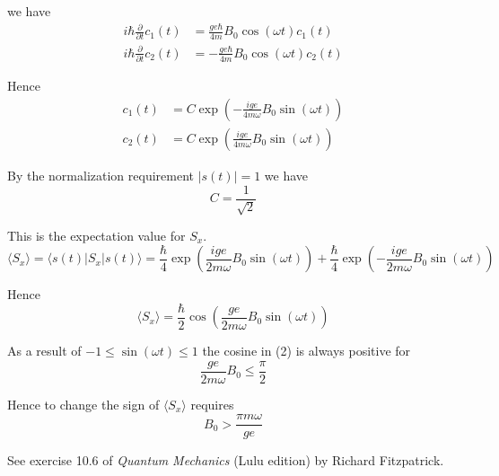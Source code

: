 we have
\begin{align*}
i\hbar\frac{\partial}{\partial t}c_1(t)&=\frac{ge\hbar}{4m}B_0\cos(\omega t)c_1(t)
\\
i\hbar\frac{\partial}{\partial t}c_2(t)&=-\frac{ge\hbar}{4m}B_0\cos(\omega t)c_2(t)
\end{align*}

Hence
\begin{equation*}
\begin{aligned}
c_1(t)&=C\exp\left(-\frac{ige}{4m\omega}B_0\sin(\omega t)\right)
\\
c_2(t)&=C\exp\left(\frac{ige}{4m\omega}B_0\sin(\omega t)\right)
\end{aligned}
\tag{1}
\end{equation*}

By the normalization requirement $|s(t)|=1$ we have
\begin{equation*}
C=\frac{1}{\sqrt2}
\end{equation*}

\iffalse
In rectangular form
\begin{equation*}
\begin{aligned}
c_1(t)&=\frac{1}{\sqrt2}\cos\left(\frac{ge}{4m\omega}B_0\sin(\omega t)\right)
-\frac{i}{\sqrt2}\sin\left(\frac{ge}{4m\omega}B_0\sin(\omega t)\right)
\\
c_2(t)&=\frac{1}{\sqrt2}\cos\left(\frac{ge}{4m\omega}B_0\sin(\omega t)\right)
+\frac{i}{\sqrt2}\sin\left(\frac{ge}{4m\omega}B_0\sin(\omega t)\right)
\end{aligned}
\end{equation*}
\fi

This is the expectation value for $S_x$.
\begin{equation*}
\langle S_x\rangle=\langle s(t)|S_x|s(t)\rangle
=\frac{\hbar}{4}\exp\left(\frac{ige}{2m\omega}B_0\sin(\omega t)\right)
+\frac{\hbar}{4}\exp\left(-\frac{ige}{2m\omega}B_0\sin(\omega t)\right)
\end{equation*}

Hence
\begin{equation*}
\langle S_x\rangle=\frac{\hbar}{2}\cos\left(\frac{ge}{2m\omega}B_0\sin(\omega t)\right)
\tag{2}
\end{equation*}

As a result of $-1\le\sin(\omega t)\le1$ the cosine in (2) is always positive for
\begin{equation*}
\frac{ge}{2m\omega}B_0\le\frac{\pi}{2}
\end{equation*}

Hence to change the sign of $\langle S_x\rangle$ requires
\begin{equation*}
B_0>\frac{\pi m\omega}{ge}
\end{equation*}

See exercise 10.6 of {\it Quantum Mechanics}
(Lulu edition) by Richard Fitzpatrick.


